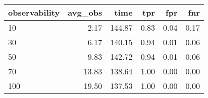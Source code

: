\begin{tabular}{lrrrrr}
\toprule
observability & avg_obs & time & tpr & fpr & fnr \\
\midrule
10 & 2.17 & 144.87 & 0.83 & 0.04 & 0.17 \\
30 & 6.17 & 140.15 & 0.94 & 0.01 & 0.06 \\
50 & 9.83 & 142.72 & 0.94 & 0.01 & 0.06 \\
70 & 13.83 & 138.64 & 1.00 & 0.00 & 0.00 \\
100 & 19.50 & 137.53 & 1.00 & 0.00 & 0.00 \\
\bottomrule
\end{tabular}
